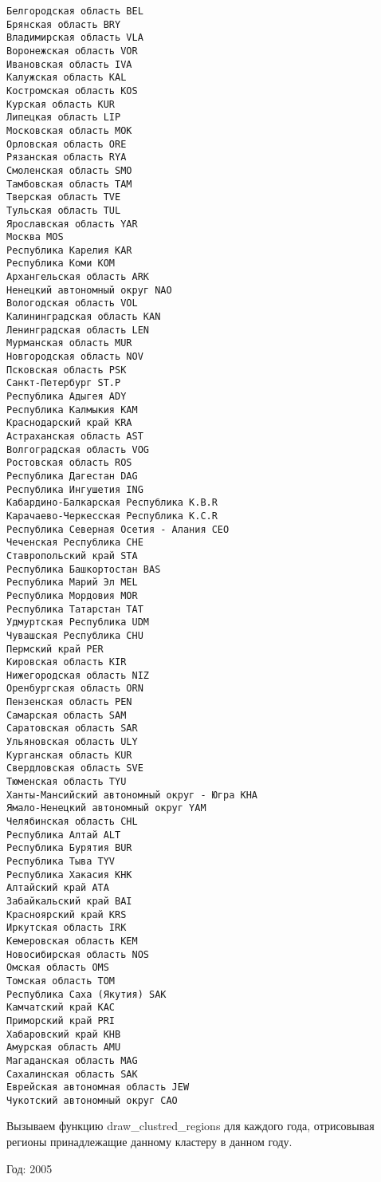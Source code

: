\documentclass[11pt]{article}
\begin{document}
    \begin{Verbatim}[commandchars=\\\{\}]
Белгородская область BEL
Брянская область BRY
Владимирская область VLA
Воронежская область VOR
Ивановская область IVA
Калужская область KAL
Костромская область KOS
Курская область KUR
Липецкая область LIP
Московская область MOK
Орловская область ORE
Рязанская область RYA
Смоленская область SMO
Тамбовская область TAM
Тверская область TVE
Тульская область TUL
Ярославская область YAR
Москва MOS
Республика Карелия KAR
Республика Коми KOM
Архангельская область ARK
Ненецкий автономный округ NAO
Вологодская область VOL
Калинингpадская область KAN
Ленинградская область LEN
Мурманская область MUR
Новгородская область NOV
Псковская область PSK
Санкт-Петербург ST.P
Республика Адыгея ADY
Республика Калмыкия KAM
Краснодарский край KRA
Астраханская область AST
Волгоградская область VOG
Ростовская область ROS
Республика Дагестан DAG
Республика Ингушетия ING
Кабардино-Балкарская Республика K.B.R
Карачаево-Черкесская Республика K.C.R
Республика Северная Осетия - Алания CEO
Чеченская Республика CHE
Ставропольский край STA
Республика Башкортостан BAS
Республика Марий Эл MEL
Республика Мордовия MOR
Республика Татарстан TAT
Удмуртская Республика UDM
Чувашская Республика CHU
Пермский край PER
Кировская область KIR
Нижегородская область NIZ
Оренбургская область ORN
Пензенская область PEN
Самарская область SAM
Саратовская область SAR
Ульяновская область ULY
Курганская область KUR
Свердловская область SVE
Тюменская область TYU
Ханты-Мансийский автономный округ - Югра KHA
Ямало-Ненецкий автономный округ YAM
Челябинская область CHL
Республика Алтай ALT
Республика Бурятия BUR
Республика Тыва TYV
Республика Хакасия KHK
Алтайский край ATA
Забайкальский край BAI
Красноярский край KRS
Иркутская область IRK
Кемеровская область KEM
Новосибирская область NOS
Омская область OMS
Томская область TOM
Республика Саха (Якутия) SAK
Камчатский край KAC
Приморский край PRI
Хабаровский край KHB
Амурская область AMU
Магаданская область MAG
Сахалинская область SAK
Еврейская автономная область JEW
Чукотский автономный округ CAO

    \end{Verbatim}

    Вызываем функцию draw\_clustred\_regions для каждого года, отрисовывая
регионы принадлежащие данному кластеру в данном году.

\begin{center}
Год:  2005
\end{center}
\end{document}
